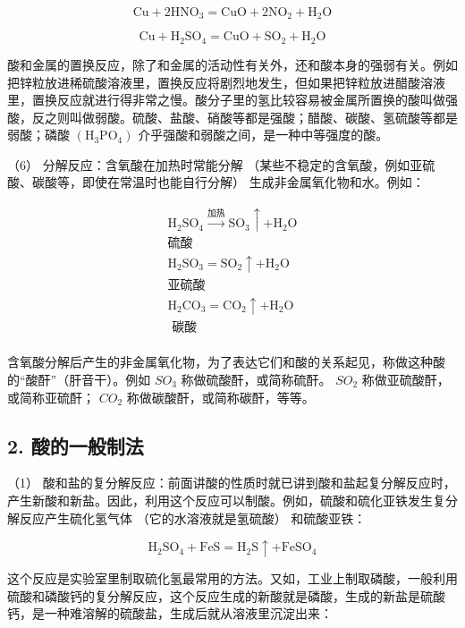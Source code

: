 \[
\mathrm{Cu} + 2 \mathrm{HNO}_{3} = \mathrm{CuO} + 2 \mathrm{NO}_{2} + \mathrm{H}_{2} \mathrm{O}
\]

\[
\mathrm{Cu} + \mathrm{H}_{2} \mathrm{SO}_{4} = \mathrm{CuO} + \mathrm{SO}_{2} + \mathrm{H}_{2} \mathrm{O}
\]

酸和金属的置换反应，除了和金属的活动性有关外，还和酸本身的强弱有关。例如把锌粒放进稀硫酸溶液里，置换反应将剧烈地发生，但如果把锌粒放进醋酸溶液里，置换反应就进行得非常之慢。酸分子里的氢比较容易被金属所置换的酸叫做强酸，反之则叫做弱酸。硫酸、盐酸、硝酸等都是强酸；醋酸、碳酸、氢硫酸等都是弱酸；磷酸
\(\left(\mathrm{H}_{3}\mathrm{PO}_{4}\right)\)
介乎强酸和弱酸之间，是一种中等强度的酸。

（6） 分解反应：含氧酸在加热时常能分解
（某些不稳定的含氧酸，例如亚硫酸、碳酸等，即使在常温时也能自行分解）
生成非金属氧化物和水。例如：

\[
\begin{array}{l} \mathrm{H}_{2}\mathrm{SO}_{4} \xrightarrow {\text{加热}} \mathrm{SO}_{3} \uparrow + \mathrm{H}_{2} \mathrm{O} \\ \text{硫酸} \\ \mathrm{H}_{2} \mathrm{SO}_{3} = \mathrm{SO}_{2} \uparrow + \mathrm{H}_{2} \mathrm{O} \\ \text{亚硫酸} \\ \mathrm{H}_{2} \mathrm{CO}_{3} = \mathrm{CO}_{2} \uparrow + \mathrm{H}_{2} \mathrm{O} \\ \text{ 碳酸 } \\ \end{array}
\]

含氧酸分解后产生的非金属氧化物，为了表达它们和酸的关系起见，称做这种酸的``酸酐''（肝音干）。例如
\(SO_{3}\) 称做硫酸酐，或简称硫酐。 \(SO_{2}\)
称做亚硫酸酐，或简称亚硫酐； \(CO_{2}\) 称做碳酸酐，或简称碳酐，等等。

\subsection{2. 酸的一般制法}

（1）
酸和盐的复分解反应：前面讲酸的性质时就已讲到酸和盐起复分解反应时，产生新酸和新盐。因此，利用这个反应可以制酸。例如，硫酸和硫化亚铁发生复分解反应产生硫化氢气体
（它的水溶液就是氢硫酸） 和硫酸亚铁：

\[
\mathrm{H}_{2}\mathrm{SO}_{4}+\mathrm{FeS}=\mathrm{H}_{2}\mathrm{S}\uparrow+\mathrm{FeSO}_{4}
\]

这个反应是实验室里制取硫化氢最常用的方法。又如，工业上制取磷酸，一般利用硫酸和磷酸钙的复分解反应，这个反应生成的新酸就是磷酸，生成的新盐是硫酸钙，是一种难溶解的硫酸盐，生成后就从溶液里沉淀出来：

